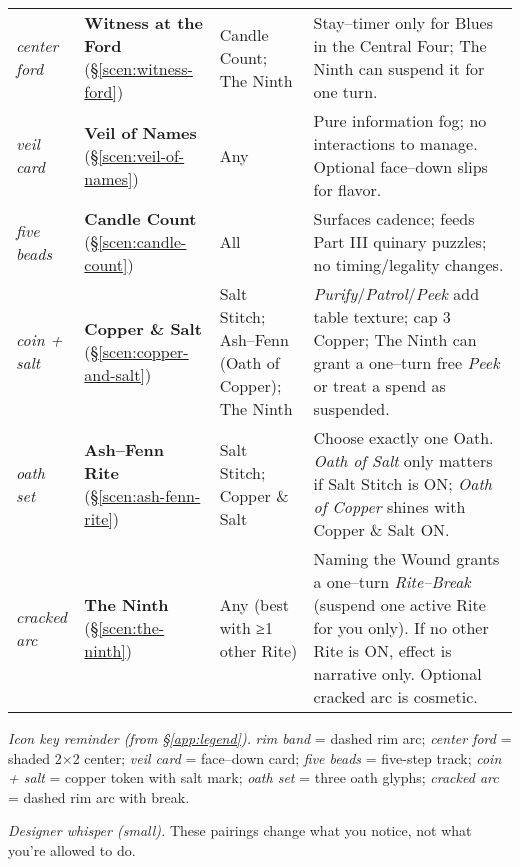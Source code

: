\documentclass[11pt]{article}
\begin{document}
\begin{itemize}
\begin{tabular}{p{2.2cm} p{3.8cm} p{6.6cm} p{4.2cm}}
\textit{center ford} %
& \textbf{Witness at the Ford} (\S\ref{scen:witness-ford})
& Candle Count; The Ninth
& Stay–timer only for Blues in the Central Four; The Ninth can suspend it for one turn.\\

\textit{veil card} %
& \textbf{Veil of Names} (\S\ref{scen:veil-of-names})
& Any
& Pure information fog; no interactions to manage. Optional face–down slips for flavor.\\

\textit{five beads} %
& \textbf{Candle Count} (\S\ref{scen:candle-count})
& All
& Surfaces cadence; feeds Part III quinary puzzles; no timing/legality changes.\\

\textit{coin + salt} %
& \textbf{Copper \& Salt} (\S\ref{scen:copper-and-salt})
& Salt Stitch; Ash–Fenn (Oath of Copper); The Ninth
& \emph{Purify}/\emph{Patrol}/\emph{Peek} add table texture; cap 3 Copper; The Ninth can grant a one–turn free \emph{Peek} or treat a spend as suspended.\\

\textit{oath set} %
& \textbf{Ash–Fenn Rite} (\S\ref{scen:ash-fenn-rite})
& Salt Stitch; Copper \& Salt
& Choose exactly one Oath. \emph{Oath of Salt} only matters if Salt Stitch is \textsc{ON}; \emph{Oath of Copper} shines with Copper \& Salt \textsc{ON}.\\

\textit{cracked arc} %
& \textbf{The Ninth} (\S\ref{scen:the-ninth})
& Any (best with ≥1 other Rite)
& Naming the Wound grants a one–turn \emph{Rite–Break} (suspend one active Rite for you only). If no other Rite is \textsc{ON}, effect is narrative only. Optional cracked arc is cosmetic.\\
\bottomrule
\end{tabular}

\medskip
\noindent\textit{Icon key reminder (from \S\ref{app:legend}).} \textit{rim band} = dashed rim arc; \textit{center ford} = shaded 2×2 center; \textit{veil card} = face–down card; \textit{five beads} = five-step track; \textit{coin + salt} = copper token with salt mark; \textit{oath set} = three oath glyphs; \textit{cracked arc} = dashed rim arc with break.

\medskip
\noindent\textit{Designer whisper (small).} These pairings change what you notice, not what you’re allowed to do.


\end{itemize}
\end{document}
